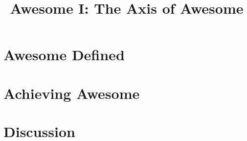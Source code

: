\documentclass{article}
\begin{document}
\title{Awesome I: The Axis of Awesome}

\section{Awesome Defined}


\section{Achieving Awesome}


\section{Discussion}
\end{document}
